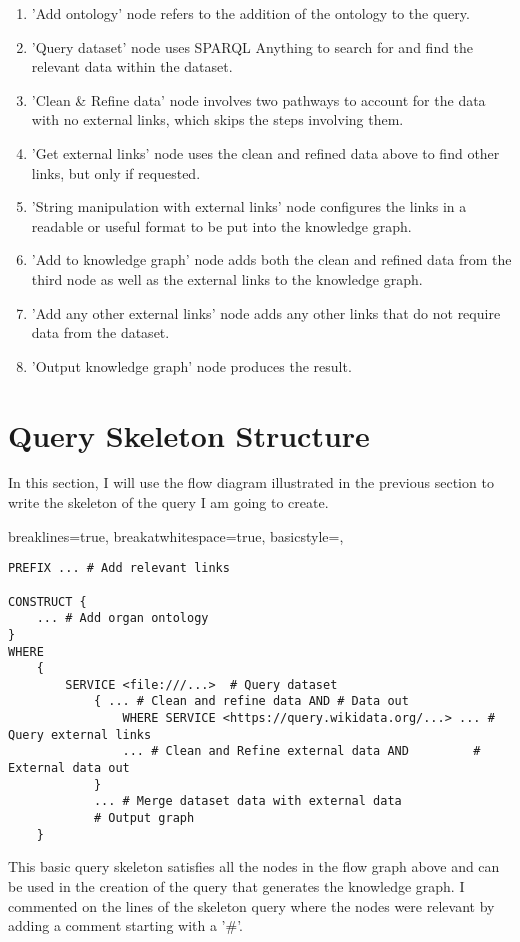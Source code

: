 \begin{enumerate}
  \item 'Add ontology' node refers to the addition of the ontology to the query.
  \item 'Query dataset' node uses SPARQL Anything to search for and find the relevant data within the dataset.
  \item 'Clean \& Refine data' node involves two pathways to account for the data with no external links, which skips the steps involving them.
  \item 'Get external links' node uses the clean and refined data above to find other links, but only if requested.
  \item 'String manipulation with external links' node configures the links in a readable or useful format to be put into the knowledge graph.
  \item 'Add to knowledge graph' node adds both the clean and refined data from the third node as well as the external links to the knowledge graph.
  \item 'Add any other external links' node adds any other links that do not require data from the dataset.
  \item 'Output knowledge graph' node produces the result.
\end{enumerate}

\section{Query Skeleton Structure}
\hspace{0.5cm} In this section, I will use the flow diagram illustrated in the previous section to write the skeleton of the query I am going to create.

\lstset
{
    breaklines=true,
    breakatwhitespace=true,
    basicstyle=\ttfamily,
}
\begin{lstlisting}
PREFIX ... # Add relevant links

CONSTRUCT {
    ... # Add organ ontology
} 
WHERE 
    { 
        SERVICE <file:///...>  # Query dataset
            { ... # Clean and refine data AND # Data out
                WHERE SERVICE <https://query.wikidata.org/...> ... # Query external links
                ... # Clean and Refine external data AND         # External data out
            }
            ... # Merge dataset data with external data
            # Output graph
    }

\end{lstlisting}

This basic query skeleton satisfies all the nodes in the flow graph above and can be used in the creation of the query that generates the knowledge graph. I commented on the lines of the skeleton query where the nodes were relevant by adding a comment starting with a '\#'. 
